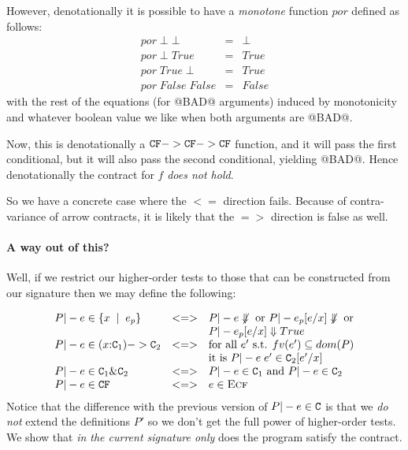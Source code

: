 \documentclass[preprint,nocopyrightspace]{sigplanconf}
\begin{document}
However, denotationally it is possible to have a {\em monotone} function $por$ defined as follows:
\[\begin{array}{lcl}
  por\;\bot\;\bot & = & \bot \\ 
  por\;\bot\;True & = & True \\
  por\;True\;\bot & = & True \\ 
  por\;False\;False & = & False
\end{array}\] 
with the rest of the equations (for @BAD@ arguments) induced by monotonicity and whatever boolean value 
we like when both arguments are @BAD@. 

Now, this is denotationally a ${\tt CF} -> {\tt CF} -> {\tt CF}$ function, and it will pass the first conditional, but it will
also pass the second conditional, yielding @BAD@. Hence denotationally the contract for $f$ {\em does not hold}.

So we have a concrete case where the $<=$ direction fails. Because of contra-variance of arrow contracts, it is 
likely that the $=>$ direction is false as well. 




\paragraph{A way out of this?}
Well, if we restrict our higher-order tests to those that can be constructed from our signature then 
we may define the following:

{\setlength{\arraycolsep}{2pt}
\[\begin{array}{lcl}
    P |- e \in \{ x\;\mid\;e_p\} & <=> & P |- e \not\Downarrow \mbox{ or } P |- e_p[e/x] \not\Downarrow \mbox{ or} \\ 
                                 &     & P |- e_p[e/x] \Downarrow True \\
    P |- e \in (x{:}{\tt C}_1) -> {\tt C}_2 & <=> & 
                                 \mbox{for all } e' \mbox{ s.t. } fv(e') \subseteq dom(P)  \\ 
                                   &   &  \mbox{it is } P |- e\;e' \in {\tt C}_2[e'/x] \\
    P |- e \in {\tt C}_1 \& {\tt C}_2 & <=> & P |- e \in {\tt C}_1 \mbox{ and } P |- e \in {\tt C}_2 \\
    P |- e \in {\tt CF}            & <=> & e \in \textsc{Ecf} 
\end{array}\]}
Notice that the difference with the previous version of $P |- e \in {\tt C}$ is that we {\em do not} extend the 
definitions $P'$ so we don't get the full power of higher-order tests. We show that {\em in the current signature
only} does the program satisfy the contract. 
\end{document}
